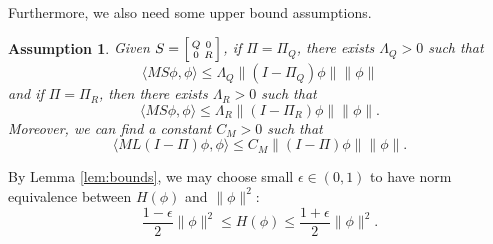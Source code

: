 \documentclass[11pt]{article}
\newtheorem{assumption}{Assumption}
\newcommand{\1}{\mathds{1}}
\begin{document}
Furthermore, we also need some upper bound assumptions. 
\begin{assumption}\label{assump:MAupper}
 Given $S = \Bigl[\begin{smallmatrix}
            Q & 0\\
            0 &  R
        \end{smallmatrix}\Bigr]$, if $\Pi=\Pi_Q$, there exists $\Lambda_Q>0$ such that      
        \begin{equation}
           \langle M S\phi, \phi\rangle\leq \Lambda_Q\|(I-\Pi_Q)\phi\|\|\phi\|
        \end{equation}
 and if $\Pi=\Pi_R$, then there exists $\Lambda_R>0$ such that
        \begin{equation}
          \langle M S\phi, \phi\rangle\leq  \Lambda_R\|(I-\Pi_R)\phi\|\|\phi\|.
        \end{equation}
        Moreover, we can find a constant $C_M>0$ such that 
     \begin{equation}
              \langle M L(I-\Pi)\phi, \phi\rangle\leq C_M \|(I-\Pi)\phi\|\|\phi\|.
     \end{equation}
\end{assumption}
By Lemma \ref{lem:bounds}, we may choose small $\epsilon\in (0,1)$ to have norm equivalence between  $H(\phi)$ and $\|\phi\|^2$:
\begin{equation}\label{eqn:normequiv}
   \frac{1-\epsilon}{2}\|\phi\|^2\leq  H(\phi)\leq \frac{1+\epsilon}{2}\|\phi\|^2.
\end{equation}
\end{document}
